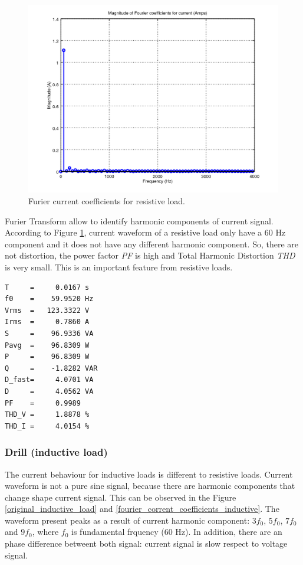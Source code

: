 \documentclass[journal]{IEEEtran}
\begin{document}
\begin{figure}[h]
\centering
\includegraphics[clip,width=\columnwidth]
{zoomed_current_furier_coefficients_resistive.png}
\caption{Furier current coefficients for resistive load.}
\label{fourier_corrent_coefficients_resistive}
\end{figure}

Furier Transform allow to identify harmonic components of
current signal. According to Figure
\ref{fourier_corrent_coefficients_resistive}, current 
waveform of a resistive load only have a 60 Hz component
and it does not have any different harmonic component. So, 
there are not distortion, the power factor \textit{PF} is 
high and Total Harmonic Distortion \textit{THD} is 
very small.
This is an important feature from resistive loads.  

\begin{lstlisting}[caption = Output for resistive load.]
T     =     0.0167 s 
f0    =    59.9520 Hz 
Vrms  =   123.3322 V
Irms  =     0.7860 A
S     =    96.9336 VA
Pavg  =    96.8309 W 
P     =    96.8309 W 
Q     =    -1.8282 VAR 
D_fast=     4.0701 VA 
D     =     4.0562 VA 
PF    =     0.9989 
THD_V =     1.8878 %
THD_I =     4.0154 %
\end{lstlisting}

\subsubsection{Drill (inductive load)} The current 
behaviour for inductive loads is different to resistive 
loads. Current waveform is not a pure sine signal, 
because there are harmonic components that change shape 
current signal. This can be observed in the Figure 
\ref{original_inductive_load} and 
\ref{fourier_corrent_coefficients_inductive}. 
The waveform present peaks as a result of 
current harmonic component: $3 f_0$, $5 f_0$, $7 f_0$ 
and $9 f_0$,  where $f_0$ is fundamental frquency (60 Hz). 
In addition, there are an 
phase difference betweent both signal: current signal is
slow respect to voltage signal.
\end{document}
